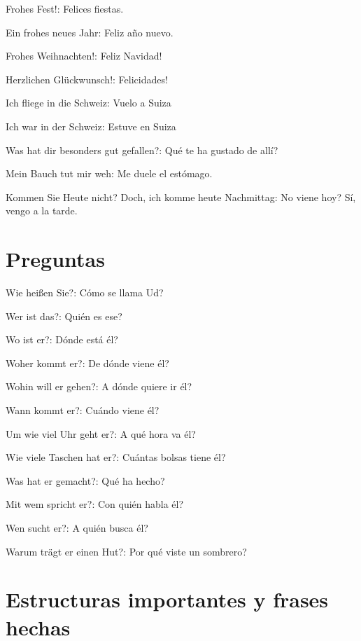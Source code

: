 \begin{myitemize}
\item Frohes Fest!: Felices fiestas.
\item Ein frohes neues Jahr: Feliz año nuevo.
\item Frohes Weihnachten!: Feliz Navidad!
\item Herzlichen Glückwunsch!: Felicidades!
\item Ich fliege in die Schweiz: Vuelo a Suiza
\item Ich war in der Schweiz: Estuve en Suiza
\item Was hat dir besonders gut gefallen?: Qué te ha gustado de allí?
\item Mein Bauch tut mir weh: Me duele el estómago.
\item Kommen Sie Heute nicht? Doch, ich komme heute Nachmittag: No viene hoy? Sí, vengo a la tarde.
\end{myitemize}

\section{Preguntas}
\begin{myitemize}
\item Wie heißen Sie?: Cómo se llama Ud?
\item Wer ist das?: Quién es ese?
\item Wo ist er?: Dónde está él?
\item Woher kommt er?: De dónde viene él?
\item Wohin will er gehen?: A dónde quiere ir él?
\item Wann kommt er?: Cuándo viene él?
\item Um wie viel Uhr geht er?: A qué hora va él?
\item Wie viele Taschen hat er?: Cuántas bolsas tiene él?
\item Was hat er gemacht?: Qué ha hecho?
\item Mit wem spricht er?: Con quién habla él?
\item Wen sucht er?: A quién busca él?
\item Warum trägt er einen Hut?: Por qué viste un sombrero?
\end{myitemize}


\section{Estructuras importantes y frases hechas}
